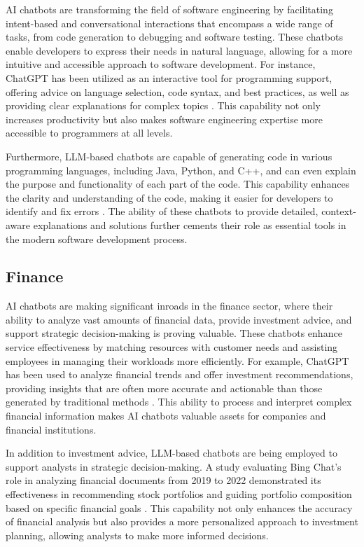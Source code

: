 AI chatbots are transforming the field of software engineering by facilitating intent-based and conversational interactions that encompass a wide range of tasks, from code generation to debugging and software testing. These chatbots enable developers to express their needs in natural language, allowing for a more intuitive and accessible approach to software development. For instance, ChatGPT has been utilized as an interactive tool for programming support, offering advice on language selection, code syntax, and best practices, as well as providing clear explanations for complex topics \cite{meyer2023chatgpt}. This capability not only increases productivity but also makes software engineering expertise more accessible to programmers at all levels.

Furthermore, LLM-based chatbots are capable of generating code in various programming languages, including Java, Python, and C++, and can even explain the purpose and functionality of each part of the code. This capability enhances the clarity and understanding of the code, making it easier for developers to identify and fix errors \cite{dam2024complete}. The ability of these chatbots to provide detailed, context-aware explanations and solutions further cements their role as essential tools in the modern software development process.

\subsection{Finance}

AI chatbots are making significant inroads in the finance sector, where their ability to analyze vast amounts of financial data, provide investment advice, and support strategic decision-making is proving valuable. These chatbots enhance service effectiveness by matching resources with customer needs and assisting employees in managing their workloads more efficiently. For example, ChatGPT has been used to analyze financial trends and offer investment recommendations, providing insights that are often more accurate and actionable than those generated by traditional methods \cite{dowling2023chatgpt}. This ability to process and interpret complex financial information makes AI chatbots valuable assets for companies and financial institutions.

In addition to investment advice, LLM-based chatbots are being employed to support analysts in strategic decision-making. A study evaluating Bing Chat's role in analyzing financial documents from 2019 to 2022 demonstrated its effectiveness in recommending stock portfolios and guiding portfolio composition based on specific financial goals \cite{altan2023science}. This capability not only enhances the accuracy of financial analysis but also provides a more personalized approach to investment planning, allowing analysts to make more informed decisions.

